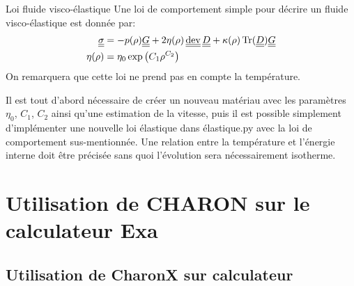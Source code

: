 \documentclass[10pt]{book}
\begin{document}
\begin{appendices}
\begin{Exercice}{Loi fluide visco-élastique} Une loi de comportement simple pour décrire un fluide visco-élastique est donnée par:
$$\begin{aligned}
\SC&=-p(\rho)\tenMetrique+2\eta(\rho)\dev\TD+\kappa(\rho)\tr(\TD)\tenMetrique\\
\eta(\rho)&=\eta_{0}\exp\left(C_{1}\rho^{C_{2}}\right)
\end{aligned}$$
On remarquera que cette loi ne prend pas en compte la température.
\end{Exercice}
\begin{Correction}{Il est tout d'abord nécessaire  de créer un nouveau matériau avec les paramètres $\eta_{0}$, $C_{1}$, $C_{2}$ ainsi qu'une estimation de la vitesse, puis il est possible simplement d'implémenter une nouvelle loi élastique dans élastique.py avec la loi de comportement sus-mentionnée. Une relation entre la température et l'énergie interne doit être précisée sans quoi l'évolution sera nécessairement isotherme.}\end{Correction}
\chapter{Utilisation de CHARON sur le calculateur Exa}
\section{Utilisation de CharonX sur calculateur}

\end{appendices}
\end{document}
